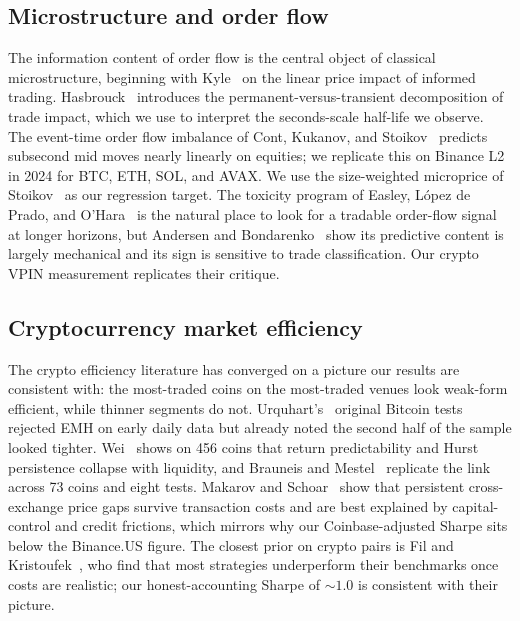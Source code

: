 \documentclass[11pt]{article}
\begin{document}
\subsection{Microstructure and order flow}
\label{sec:related-micro}

The information content of order flow is the central object of classical microstructure,
beginning with Kyle~\cite{kyle1985continuous} on the linear price impact of informed
trading. Hasbrouck~\cite{hasbrouck1991measuring} introduces the permanent-versus-transient
decomposition of trade impact, which we use to interpret the seconds-scale half-life we
observe. The event-time order flow imbalance of Cont, Kukanov, and
Stoikov~\cite{contkukanovstoikov2014} predicts subsecond mid moves nearly linearly on
equities; we replicate this on Binance L2 in 2024 for BTC, ETH, SOL, and AVAX. We use the
size-weighted microprice of Stoikov~\cite{stoikov2018microprice} as our regression target.
The toxicity program of Easley, L\'opez de Prado, and O'Hara~\cite{easley2012vpin} is the
natural place to look for a tradable order-flow signal at longer horizons, but Andersen and
Bondarenko~\cite{andersen2014vpin} show its predictive content is largely mechanical and
its sign is sensitive to trade classification. Our crypto VPIN measurement replicates their
critique.

\subsection{Cryptocurrency market efficiency}
\label{sec:related-crypto}

The crypto efficiency literature has converged on a picture our results are consistent
with: the most-traded coins on the most-traded venues look weak-form efficient, while
thinner segments do not. Urquhart's~\cite{urquhart2016inefficiency} original Bitcoin tests
rejected EMH on early daily data but already noted the second half of the sample looked
tighter. Wei~\cite{wei2018liquidity} shows on 456 coins that return predictability and
Hurst persistence collapse with liquidity, and Brauneis and Mestel~\cite{brauneis2018price}
replicate the link across 73 coins and eight tests. Makarov and
Schoar~\cite{makarov2020trading} show that persistent cross-exchange price gaps survive
transaction costs and are best explained by capital-control and credit frictions, which
mirrors why our Coinbase-adjusted Sharpe sits below the Binance.US figure. The closest
prior on crypto pairs is Fil and Kristoufek~\cite{fil2020pairs}, who find that most
strategies underperform their benchmarks once costs are realistic; our honest-accounting
Sharpe of $\sim$$1.0$ is consistent with their picture.
\end{document}
